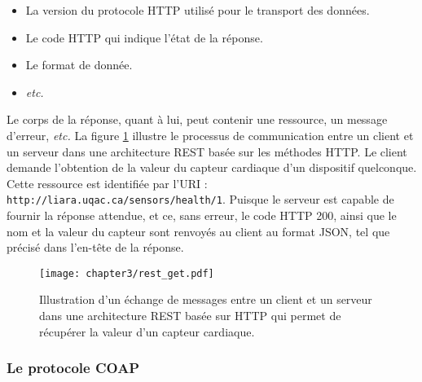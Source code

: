 \begin{itemize}[label=\textbullet]
    \item
        La version du protocole \ac{HTTP} utilisé pour le transport des données.
    \item
        Le code \ac{HTTP} \citep{Fielding2014} qui indique l'état de la réponse.
    \item
        Le format de donnée.
    \item
        \textit{etc.}
\end{itemize}

\noindent Le corps de la réponse, quant à lui, peut contenir une ressource, un message d'erreur, \textit{etc.} La figure \ref{fig:rest_get} illustre le processus de communication entre un client et un serveur dans une architecture \ac{REST} basée sur les méthodes \ac{HTTP}. Le client demande l'obtention de la valeur du capteur cardiaque d'un dispositif quelconque. Cette ressource est identifiée par l'\ac{URI} : \texttt{http://liara.uqac.ca/sensors/health/1}. Puisque le serveur est capable de fournir la réponse attendue, et ce, sans erreur, le code \ac{HTTP} 200, ainsi que le nom et la valeur du capteur sont renvoyés au client au format \ac{JSON}, tel que précisé dans l'en-tête de la réponse.

\begin{figure}[H]
	\centering
	\texttt{[image: chapter3/rest\_get.pdf]}
        \caption{Illustration d'un échange de messages entre un client et un serveur dans une architecture \ac{REST} basée sur \ac{HTTP} qui permet de récupérer la valeur d'un capteur cardiaque.}
	\label{fig:rest_get}
\end{figure}

\subsubsection{Le protocole \ac{COAP}}


